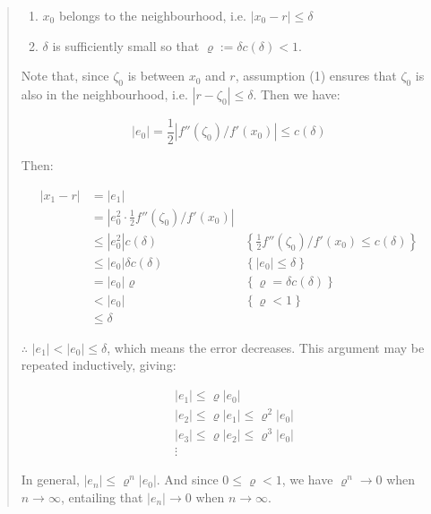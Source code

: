 \documentclass[12pt]{article}
\theoremstyle{definition}
\begin{document}
\begin{quote}
\begin{enumerate}
    \item $x_0$ belongs to the neighbourhood, i.e. $\left| x_0 - r \right| \leq
        \delta$ 
    \item $\delta$ is sufficiently small so that $\varrho := \delta c(\delta) < 1$.
\end{enumerate}

Note that, since $\zeta_0$ is between $x_0$ and $r$, assumption (1) ensures that
$\zeta_0$ is also in the neighbourhood, i.e. $\left| r - \zeta_0 \right| \leq
\delta$. Then we have:

\begin{equation*}
    \left| e_0 \right| = \frac{1}{2} \left| f''(\zeta_0) / f'(x_0) \right| \leq c(\delta)
\end{equation*}

Then:

\begin{align*}
    \left| x_1 - r \right|  
    &= \left| e_1 \right|  \\ 
    &= \left| e_0^2 \cdot \frac{1}{2} f''(\zeta_0) / f'(x_0)  \right|  \\ 
    &\leq |e_0^2| c(\delta) &\left\{ \frac{1}{2}f''(\zeta_0) / f'(x_0) \leq c(\delta) \right\}  \\ 
    &\leq |e_0| \delta c(\delta) &\left\{ \left| e_0 \right| \leq \delta
    \right\}  \\ 
    &=\left| e_0 \right| \varrho &\left\{ \varrho = \delta c(\delta) \right\} \\
    &< \left| e_0 \right|  &\left\{ \varrho < 1 \right\}  \\ 
    &\leq \delta
\end{align*}

$\therefore $ $\left| e_1 \right| < \left| e_0 \right| \leq \delta$, which means
the error decreases. This argument may be repeated inductively, giving:
 
\begin{align*}
    &\left| e_1 \right|  \leq \varrho \left| e_0 \right|  \\ 
    &\left| e_2 \right|  \leq \varrho \left| e_1 \right| \leq \varrho^2 \left| e_0 \right|   \\ 
    &\left| e_3 \right|  \leq \varrho \left| e_2 \right| \leq \varrho^3 \left| e_0 \right|   \\ 
    &\vdots
\end{align*}

In general, $\left| e_{n} \right| \leq \varrho^n \left| e_0 \right|
$. And since $0 \leq \varrho < 1$, we have $\varrho^n \to 0$ when $n \to \infty$,
entailing that $\left| e_n \right| \to 0$ when $n \to \infty$.
\end{quote}
\normalsize
\end{document}
